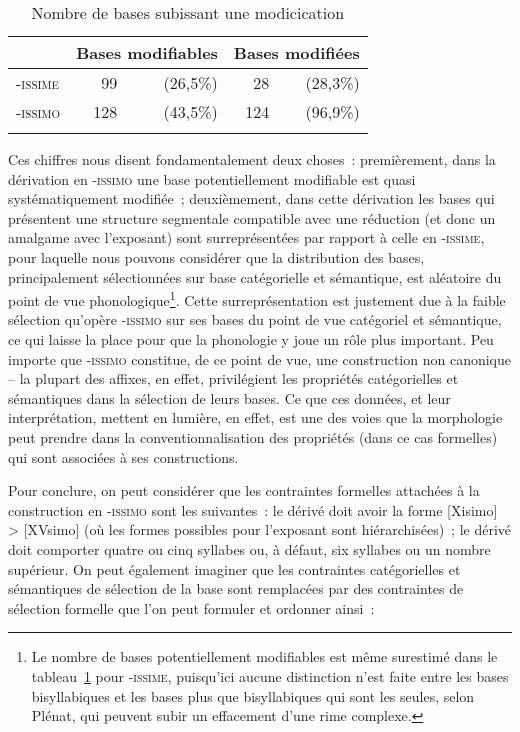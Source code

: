 \documentclass[output=paper]{langsci/langscibook}
\begin{document}
\begin{table}[h]
\centering
\begin{tabular}[t]{lrrrr}
\lsptoprule
&\multicolumn{2}{c}{Bases modifiables} & \multicolumn{2}{c}{Bases modifiées}\\
\midrule
-\textsc{issime} &99 & (26,5\%) &28 & (28,3\%)\\
-\textsc{issimo} &128 & (43,5\%) &124 & (96,9\%)\\
\lspbottomrule
\end{tabular}
\caption{\label{ex:Montermini:20} Nombre de bases subissant une modicication}
\end{table}



Ces chiffres nous disent fondamentalement deux choses~: premièrement,
dans la dérivation en -\textsc{issimo} une base potentiellement
modifiable est quasi systématiquement modifiée~; deuxièmement, dans
cette dérivation les bases qui présentent une structure segmentale
compatible avec une réduction (et donc un amalgame avec l'exposant)
sont surreprésentées par rapport à celle en -\textsc{issime}, pour
laquelle nous pouvons considérer que la distribution des bases,
principalement sélectionnées sur base catégorielle et sémantique, est
aléatoire du point de vue phonologique\footnote{Le nombre de bases
  potentiellement modifiables est même surestimé dans le tableau~\ref{ex:Montermini:20} pour
  -\textsc{issime}, puisqu'ici aucune distinction n'est faite entre les
  bases bisyllabiques et les bases plus que bisyllabiques qui sont les
  seules, selon Plénat, qui peuvent subir un effacement d'une rime
  complexe.}. Cette surreprésentation est justement due à la faible
sélection qu'opère -\textsc{issimo} sur ses bases du point de vue
catégoriel et sémantique, ce qui laisse la place pour que la phonologie
y joue un rôle plus important. Peu importe que \mbox{\textsc{-issimo}}
constitue, de ce point de vue, une construction non canonique -- la
plupart des affixes, en effet, privilégient les propriétés catégorielles
et sémantiques dans la sélection de leurs bases. Ce que ces données, et
leur interprétation, mettent en lumière, en effet, est une des voies que
la morphologie peut prendre dans la conventionnalisation des propriétés
(dans ce cas formelles) qui sont associées à ses constructions.

Pour conclure, on peut considérer que les contraintes formelles
attachées à la construction en -\textsc{issimo} sont les suivantes~: le
dérivé doit avoir la forme {[}Xisimo{]} \textgreater{} {[}XVsimo{]} (où
les formes possibles pour l'exposant sont hiérarchisées)~; le dérivé
doit comporter quatre ou cinq syllabes ou, à défaut, six syllabes ou un
nombre supérieur. On peut également imaginer que les
contraintes catégorielles et sémantiques de sélection de la base sont
remplacées par des contraintes de sélection formelle que l'on peut
formuler et ordonner ainsi~:
\end{document}
